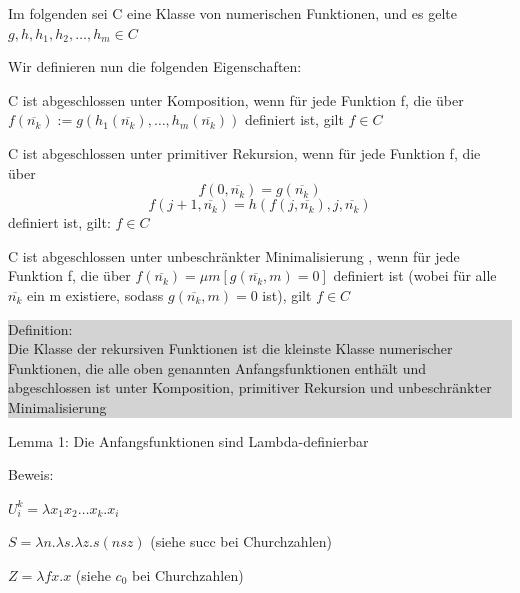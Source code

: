 \documentclass[10pt]{article}
\begin{document}
  \begin{itemize*}
    \item Im folgenden sei C eine Klasse von numerischen Funktionen, und es gelte $g,h,h_1,h_2,…,h_m \in C$
    \item Wir definieren nun die folgenden Eigenschaften:
    \begin{itemize*}
      \item C ist \color{blue} abgeschlossen unter Komposition\color{black}, wenn für jede Funktion f, die über $f(\overline{n_k}):= g(h_1(\overline{n_k}),…,h_m(\overline{n_k}))$ definiert ist, gilt $f \in C$
      \item C ist \color{blue} abgeschlossen unter primitiver Rekursion\color{black}, wenn für jede Funktion f, die über
      $$f(0,\overline{n_k}) = g(\overline{n_k})$$
      $$f(j+1, \overline{n_k}) = h(f(j,\overline{n_k}),j,\overline{n_k})$$
      definiert ist, gilt: $f \in C$
      \item C ist \color{blue} abgeschlossen unter unbeschränkter Minimalisierung \color{black}, wenn für jede Funktion f, die über $f(\overline{n_k})=\mu m[g(\overline{n_k},m)= 0]$ definiert ist (wobei für alle $\overline{n_k}$ ein m existiere, sodass $g(\overline{n_k},m) = 0$ ist), gilt $f \in C$
    \end{itemize*}
  \end{itemize*}
  
  \colorbox{lightgray}{\begin{minipage}[h]{1.0\linewidth}
      Definition: \\
      Die Klasse der rekursiven Funktionen ist die kleinste Klasse numerischer Funktionen, die alle oben genannten Anfangsfunktionen enthält und abgeschlossen ist unter Komposition, primitiver Rekursion und unbeschränkter Minimalisierung
    \end{minipage}
  }
  
  \begin{itemize*}
    \item \color{blue} Lemma 1: Die Anfangsfunktionen sind Lambda-definierbar \color{black}
    \item Beweis:
    \begin{itemize*}
      \item $U_i^k = \lambda x_1 x_2 … x_k.x_i$
      \item $S = \lambda n.\lambda s. \lambda z.s(nsz)$ (siehe succ bei Churchzahlen)
      \item $Z = \lambda fx.x$ (siehe $c_0$ bei Churchzahlen)
    \end{itemize*}
  \end{itemize*}
  
\end{document}
